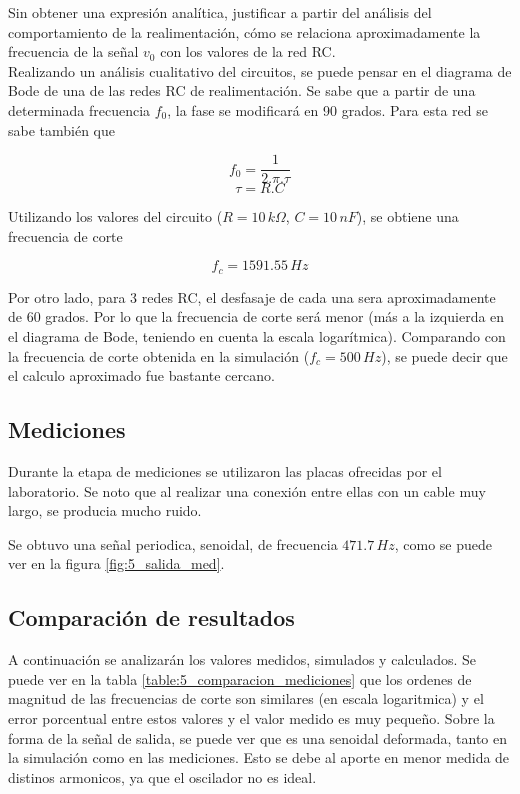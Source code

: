 \documentclass[10pt,spanish,a4paper,notitlepage]{article}
\begin{document}
{\color{OliveGreen} 
Sin obtener una expresión analítica, justificar a partir del
análisis del comportamiento de la realimentación, cómo se relaciona
aproximadamente la frecuencia de la señal $v_0$ con los valores de la red RC.}
\\

Realizando un análisis cualitativo del circuitos, se puede pensar en el diagrama
de Bode de una de las redes RC de realimentación. Se sabe que a partir de una
determinada frecuencia $f_0$, la fase se modificará en 90 grados.
Para esta red se sabe también que

\[ \displaystyle f_0=\frac{1}{2.\pi.\tau} \]
\[ \displaystyle \tau=R.C \]

Utilizando los valores del circuito ($R=10\,\unit{k\Omega}$, $C=10\,\unit{nF}$),
se obtiene una frecuencia de corte

\[\displaystyle f_c=1591.55\,\unit{Hz}\]

Por otro lado, para 3 redes RC, el desfasaje de cada una sera aproximadamente de
60 grados. Por lo que la frecuencia de corte será menor (más a la izquierda en el
diagrama de Bode, teniendo en cuenta la escala logarítmica). Comparando con la
frecuencia de corte obtenida en la simulación ($f_c=500\,\unit{Hz}$), se puede
decir que el calculo aproximado fue bastante cercano.

\subsection{Mediciones}

Durante la etapa de mediciones se utilizaron las placas ofrecidas por el laboratorio. Se noto que al realizar una conexión entre ellas con un cable muy largo, se producia mucho ruido.

Se obtuvo una señal periodica, senoidal, de frecuencia $471.7\,\unit{Hz}$, como se puede ver en la figura \ref{fig:5_salida_med}.

\subsection{Comparación de resultados}

A continuación se analizarán los valores medidos, simulados y calculados. Se puede ver en la tabla \ref{table:5_comparacion_mediciones} que los ordenes de magnitud de las frecuencias de corte son similares (en escala logaritmica) y el error porcentual entre estos valores y el valor medido es muy pequeño.
Sobre la forma de la señal de salida, se puede ver que es una senoidal deformada, tanto en la simulación como en las mediciones. Esto se debe al aporte en menor medida de distinos armonicos, ya que el oscilador no es ideal.
\end{document}
